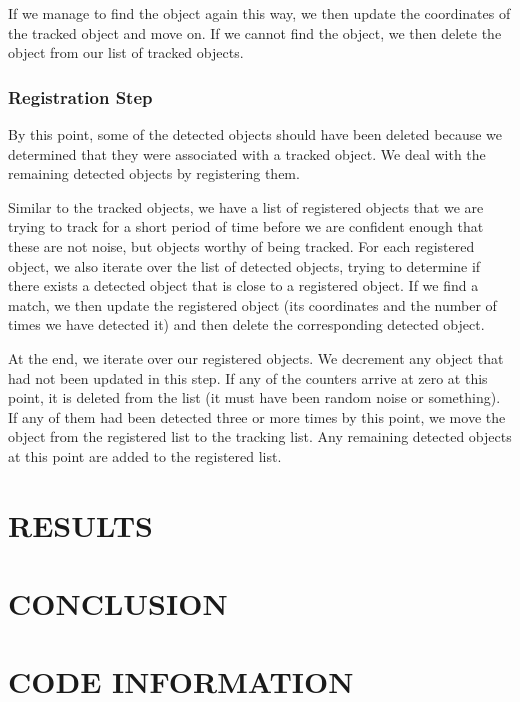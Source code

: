 \documentclass[a4paper, 10pt, conference]{ieeeconf}      %
\begin{document}
If we manage to find the object again this way, we then update the coordinates of the tracked object and move on. If we cannot find the object, we then delete the object from our list of tracked objects. \newline 

\subsubsection{Registration Step}

By this point, some of the detected objects should have been deleted because we determined that they were associated with a tracked object. We deal with the remaining detected objects by registering them. \newline

Similar to the tracked objects, we have a list of registered objects that we are trying to track for a short period of time before we are confident enough that these are not noise, but objects worthy of being tracked. For each registered object, we also iterate over the list of detected objects, trying to determine if there exists a detected object that is close to a registered object. If we find a match, we then update the registered object (its coordinates and the number of times we have detected it) and then delete the corresponding detected object. \newline

At the end, we iterate over our registered objects. We decrement any object that had not been updated in this step. If any of the counters arrive at zero at this point, it is deleted from the list (it must have been random noise or something). If any of them had been detected three or more times by this point, we move the object from the registered list to the tracking list. Any remaining detected objects at this point are added to the registered list. \newline

\section{RESULTS}


\section{CONCLUSION}


\section{CODE INFORMATION}
\end{document}
